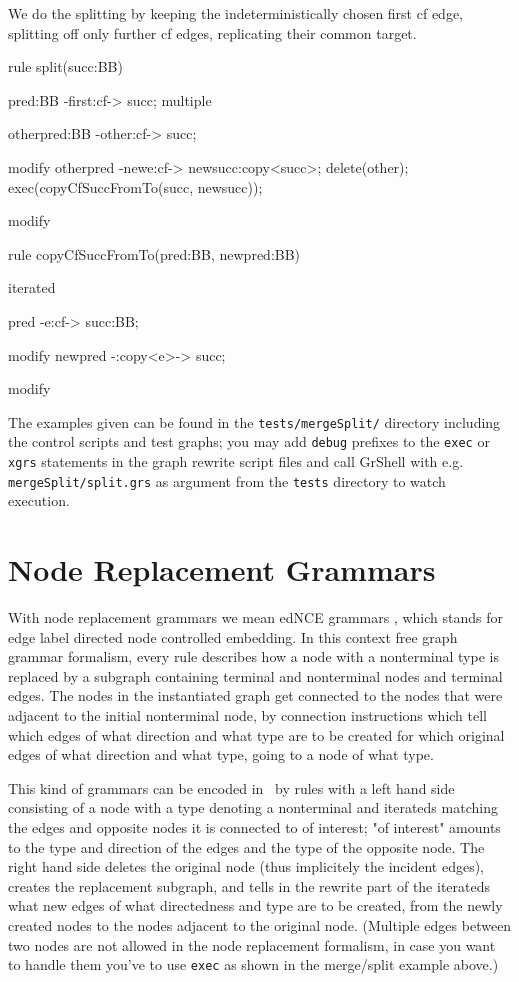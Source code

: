   \begin{example}
We do the splitting by keeping the indeterministically chosen first cf edge, splitting off only further cf edges, replicating their common target.

    \begin{grgen}
rule split(succ:BB)
{
  pred:BB -first:cf-> succ;
  multiple {
    otherpred:BB -other:cf-> succ;

    modify {
      otherpred -newe:cf-> newsucc:copy<succ>;
      delete(other);
      exec(copyCfSuccFromTo(succ, newsucc));
    }
  }

  modify {
  }
}

rule copyCfSuccFromTo(pred:BB, newpred:BB)
{
  iterated {
    pred -e:cf-> succ:BB;

    modify {
      newpred -:copy<e>-> succ;
    }
  }

  modify {
  }
}
    \end{grgen}
  \end{example}

The examples given can be found in the \texttt{tests/mergeSplit/} directory including the control scripts and test graphs; you may add \texttt{debug} prefixes to the \texttt{exec} or \texttt{xgrs} statements in the graph rewrite script files and call GrShell with e.g. \texttt{mergeSplit/split.grs} as argument from the \texttt{tests} directory to watch execution.


\section{Node Replacement Grammars}
With node replacement grammars we mean edNCE grammars \cite{NodeReplacement}, which stands for edge label directed node controlled embedding. In this context free graph grammar formalism, every rule describes how a node with a nonterminal type is replaced by a subgraph containing terminal and nonterminal nodes and terminal edges. The nodes in the instantiated graph get connected to the nodes that were adjacent to the initial nonterminal node, by connection instructions which tell which edges of what direction and what type are to be created for which original edges of what direction and what type, going to a node of what type.

This kind of grammars can be encoded in \GrG~by rules with a left hand side consisting of a node with a type denoting a nonterminal and iterateds matching the edges and opposite nodes it is connected to of interest; "of interest" amounts to the type and direction of the edges and the type of the opposite node. The right hand side deletes the original node (thus implicitely the incident edges), creates the replacement subgraph, and tells in the rewrite part of the iterateds what new edges of what directedness and type are to be created, from the newly created nodes to the nodes adjacent to the original node. (Multiple edges between two nodes are not allowed in the node replacement formalism, in case you want to handle them you've to use \texttt{exec} as shown in the merge/split example above.)

